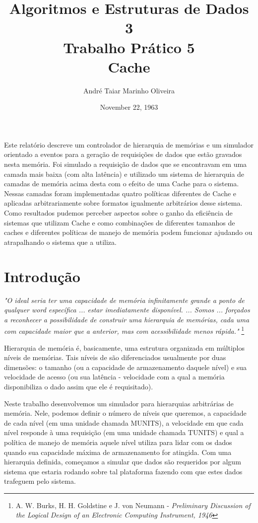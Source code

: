 \documentclass[12pt]{article}
\title{Algoritmos e Estruturas de Dados 3 \\ Trabalho Prático 5 \\
\huge{Cache}}
\date{November 22, 1963}
\author{André Taiar Marinho Oliveira}
\begin{document}
\maketitle

\begin{resumo}
\label{resumo}
Este relatório descreve um controlador de hierarquia de memórias e um simulador orientado a eventos para a geração de requisições de dados que estão gravados nesta memória. Foi simulado a requisição de dados que se encontravam em uma camada mais baixa (com alta latência) e utilizado um sistema de hierarquia de camadas de memória acima desta com o efeito de uma Cache para o sistema. Nessas camadas foram implementadas quatro políticas diferentes de Cache e aplicadas arbitrariamente sobre formatos igualmente arbitrários desse sistema. Como resultados pudemos perceber aspectos sobre o ganho da eficiência de sistemas que utilizam Cache e como combinações de diferentes tamanhos de caches e diferentes políticas de manejo de memória podem funcionar ajudando ou atrapalhando o sistema que a utiliza.
\end{resumo}

\section{Introdução}
\label{introducao}
\textit{"O ideal seria ter uma capacidade de memória infinitamente grande a ponto de qualquer word específica ... estar imediatamente disponível. ... Somos ... forçados a reconhecer a possibilidade de construir uma hierarquia de memórias, cada uma com capacidade maior que a anterior, mas com acessibilidade menos rápida."} \footnote{A. W. Burks, H. H. Goldstine e J. von Neumann - \textit{Preliminary Discussion of the Logical Design of an Electronic Computing Instrument, 1946}}

Hierarquia de memória é, basicamente, uma estrutura organizada em múltiplos níveis de memórias. Tais níveis de são diferenciados usualmente por duas dimensões: o tamanho (ou a capacidade de armazenamento daquele nível) e sua velocidade de acesso (ou sua latência - velocidade com a qual a memória disponibiliza o dado assim que ele é requisitado).

Neste trabalho desenvolvemos um simulador para hierarquias arbitrárias de memória. Nele, podemos definir o número de níveis que queremos, a capacidade de cada nível (em uma unidade chamada MUNITS), a velocidade em que cada nível responde à uma requisição (em uma unidade chamada TUNITS) e qual a política de manejo de memória aquele nível utiliza para lidar com os dados quando sua capacidade máxima de armazenamento for atingida. Com uma hierarquia definida, começamos a simular que dados são requeridos por algum sistema que estaria rodando sobre tal plataforma fazendo com que estes dados trafeguem pelo sistema.
\end{document}
